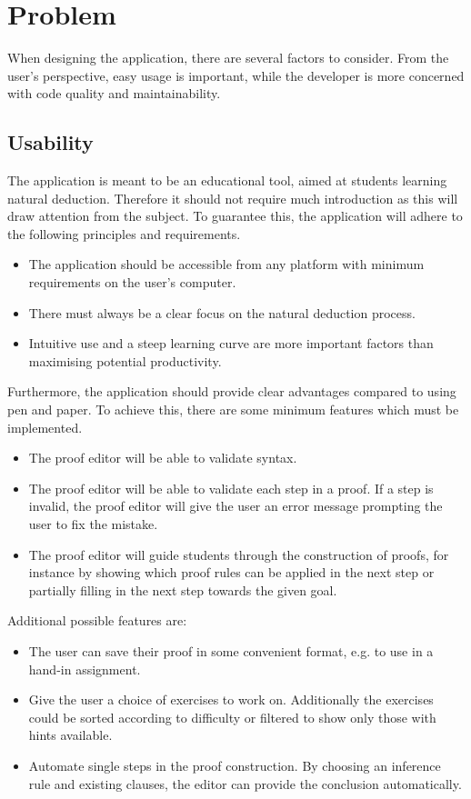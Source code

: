 \section{Problem}

When designing the application, there are several factors to consider. From the user's perspective, easy usage is important, while the developer is more concerned with code quality and maintainability.

\subsection{Usability}
The application is meant to be an educational tool, aimed at students learning natural deduction. Therefore it should not require much introduction as this will draw attention from the subject. To guarantee this, the application will adhere to the following principles and requirements.

\begin{itemize}
    \item The application should be accessible from any platform with minimum requirements on the user's computer.
    \item There must always be a clear focus on the natural deduction process.
    \item Intuitive use and a steep learning curve are more important factors than maximising potential productivity.
\end{itemize}

Furthermore, the application should provide clear advantages compared to using pen and paper. To achieve this, there are some minimum features which must be implemented.

\begin{itemize}
    \item The proof editor will be able to validate syntax.
    \item The proof editor will be able to validate each step in a proof. If a step is invalid, the proof editor will give the user an error message prompting the user to fix the mistake.
    \item The proof editor will guide students through the construction of proofs, for instance by showing which proof rules can be applied in the next step or partially filling in the next step towards the given goal.
\end{itemize}

Additional possible features are:
\begin{itemize}
    \item The user can save their proof in some convenient format, e.g. to use in a hand-in assignment.
    \item Give the user a choice of exercises to work on. Additionally the exercises could be sorted according to difficulty or filtered to show only those with hints available.
    \item Automate single steps in the proof construction. By choosing an inference rule and existing clauses, the editor can provide the conclusion automatically.
\end{itemize}

